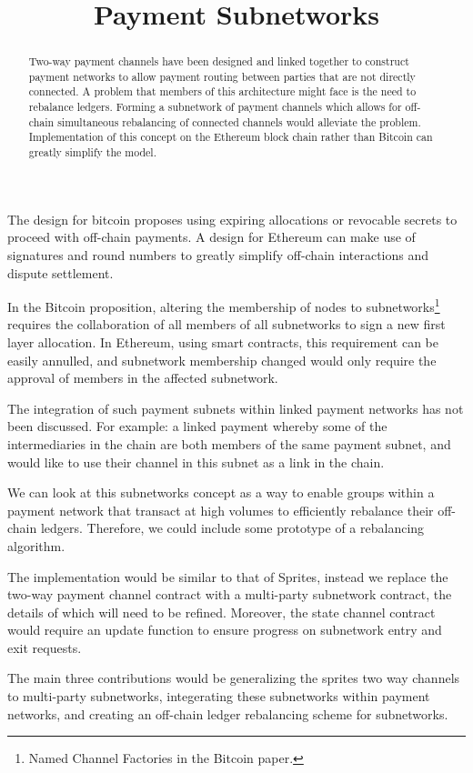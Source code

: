 \documentclass[12pt]{article}
\title{Payment Subnetworks\vspace{-5em}}
\date{}
\author{}
\begin{document}
\maketitle
\begin{abstract}
Two-way payment channels have been designed and linked together to construct payment networks to allow payment routing between parties that are not directly connected. A problem that members of this architecture might face is the need to rebalance ledgers. Forming a subnetwork of payment channels which allows for off-chain simultaneous rebalancing of connected channels would alleviate the problem. Implementation of this concept on the Ethereum block chain rather than Bitcoin can greatly simplify the model.
\end{abstract}

The design for bitcoin proposes using expiring allocations or revocable secrets to proceed with off-chain payments. A design for Ethereum can make use of signatures and round numbers to greatly simplify off-chain interactions and dispute settlement.

In the Bitcoin proposition, altering the membership of nodes to subnetworks\footnote{Named Channel Factories in the Bitcoin paper.} requires the collaboration of all members of all subnetworks to sign a new first layer allocation. In Ethereum, using smart contracts, this requirement can be easily annulled, and subnetwork membership changed would only require the approval of members in the affected subnetwork.

The integration of such payment subnets within linked payment networks has not been discussed. For example: a linked payment whereby some of the intermediaries in the chain are both members of the same payment subnet, and would like to use their channel in this subnet as a link in the chain.

We can look at this subnetworks concept as a way to enable groups within a payment network that transact at high volumes to efficiently rebalance their off-chain ledgers. Therefore, we could include some prototype of a rebalancing algorithm.

The implementation would be similar to that of Sprites, instead we replace the two-way payment channel contract with a multi-party subnetwork contract, the details of which will need to be refined. Moreover, the state channel contract would require an update function to ensure progress on subnetwork entry and exit requests.

The main three contributions would be generalizing the sprites two way channels to multi-party subnetworks, integerating these subnetworks within payment networks, and creating an off-chain ledger rebalancing scheme for subnetworks.
\end{document}
